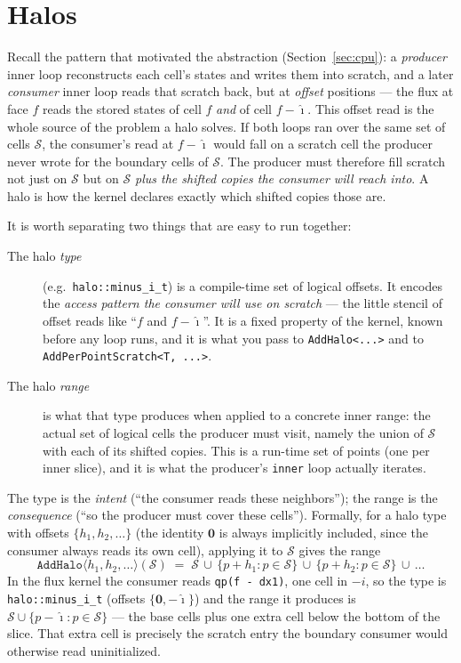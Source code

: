 \documentclass[11pt]{article}
\newcommand{\code}[1]{\lstinline[basicstyle=\ttfamily]|#1|}
\newcommand{\Sset}{\mathcal{S}}
\begin{document}
\section{Halos}
\label{sec:halos}

Recall the pattern that motivated the abstraction (Section~\ref{sec:cpu}): a
\emph{producer} inner loop reconstructs each cell's states and writes them into
scratch, and a later \emph{consumer} inner loop reads that scratch back, but at
\emph{offset} positions --- the flux at face $f$ reads the stored states of cell
$f$ \emph{and} of cell $f - \hat{\imath}$. This offset read is the whole source of
the problem a halo solves. If both loops ran over the same set of cells $\Sset$, the
consumer's read at $f - \hat{\imath}$ would fall on a scratch cell the producer
never wrote for the boundary cells of $\Sset$. The producer must therefore fill
scratch not just on $\Sset$ but on $\Sset$ \emph{plus the shifted copies the
consumer will reach into}. A halo is how the kernel declares exactly which shifted
copies those are.

It is worth separating two things that are easy to run together:
\begin{description}
\item[The halo \emph{type}] (e.g.\ \code{halo::minus_i_t}) is a compile-time set of
  logical offsets. It encodes the \emph{access pattern the consumer will use on
  scratch} --- the little stencil of offset reads like ``$f$ and $f -
  \hat{\imath}$''. It is a fixed property of the kernel, known before any loop
  runs, and it is what you pass to \code{AddHalo<...>} and to
  \code{AddPerPointScratch<T, ...>}.
\item[The halo \emph{range}] is what that type produces when applied to a concrete
  inner range: the actual set of logical cells the producer must visit, namely the
  union of $\Sset$ with each of its shifted copies. This is a run-time set of
  points (one per inner slice), and it is what the producer's \code{inner} loop
  actually iterates.
\end{description}
The type is the \emph{intent} (``the consumer reads these neighbors''); the range
is the \emph{consequence} (``so the producer must cover these cells''). Formally,
for a halo type with offsets $\{h_1, h_2, \dots\}$ (the identity $\mathbf{0}$ is
always implicitly included, since the consumer always reads its own cell),
applying it to $\Sset$ gives the range
\[
  \texttt{AddHalo}\langle h_1, h_2, \dots\rangle(\Sset)
  \;=\; \Sset \,\cup\, \{p + h_1 : p \in \Sset\} \,\cup\,
  \{p + h_2 : p \in \Sset\} \,\cup\, \dots
\]
In the flux kernel the consumer reads \code{qp(f - dx1)}, one cell in $-i$, so the
type is \code{halo::minus_i_t} (offsets $\{\mathbf{0}, -\hat{\imath}\}$) and the
range it produces is $\Sset \cup \{p - \hat{\imath} : p \in \Sset\}$ --- the base
cells plus one extra cell below the bottom of the slice. That extra cell is
precisely the scratch entry the boundary consumer would otherwise read uninitialized.
\end{document}
